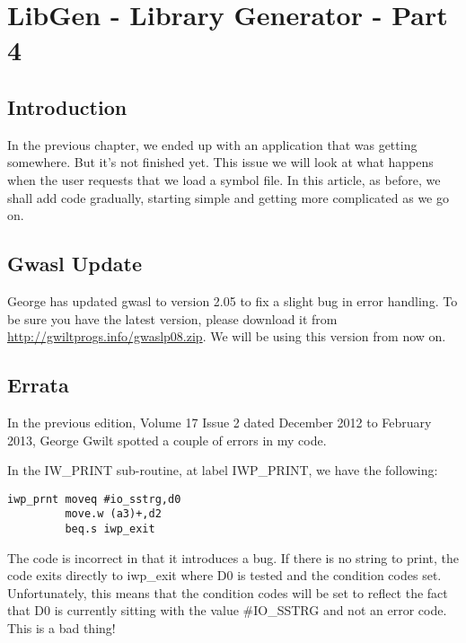 \chapter{LibGen -{} Library Generator -{} Part 4}

\section{Introduction}
\label{ch33-intro}%

In the previous chapter, we ended up with an application that was getting
    somewhere. But it's not finished yet. This issue we will look at what
    happens when the user requests that we load a symbol file. In this
    article, as before, we shall add code gradually, starting simple and
    getting more complicated as we go on.

\section{Gwasl Update}
\label{ch33-gwasl-update}%

George has updated gwasl to version 2.05
    to fix a slight bug in error handling. To be sure you have the latest
    version, please download it from \href{http://gwiltprogs.info/gwaslp08.zip}{http://gwiltprogs.info/\-gwaslp08.zip}.
    We will be using this version from now on.

\section{Errata}
\label{ch33-errata}%

In the previous edition, Volume 17 Issue 2 dated December 2012 to
    February 2013, George Gwilt spotted a couple of errors in my code.

In the IW\_PRINT sub-{}routine, at label
 IWP\_PRINT, we have the following:

\begin{lstlisting}[firstnumber=1,]
iwp_prnt moveq #io_sstrg,d0
         move.w (a3)+,d2
         beq.s iwp_exit
\end{lstlisting}

The code is incorrect in that it introduces a bug. If there is no
    string to print, the code exits directly to iwp\_exit where D0 is tested
    and the condition codes set. Unfortunately, this means that the condition
    codes will be set to reflect the fact that D0 is currently sitting with
    the value \#IO\_SSTRG and not an error code. This is a bad thing!

